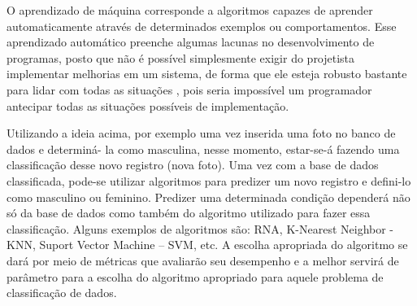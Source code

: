 O aprendizado de máquina corresponde a algoritmos capazes de aprender automaticamente através de determinados exemplos ou comportamentos. Esse aprendizado automático preenche algumas lacunas no desenvolvimento de programas, posto que não é possível simplesmente exigir do projetista implementar melhorias em um sistema, de forma que ele esteja robusto bastante para lidar com todas as situações \cite{RusselStuart.Norvig2013}, pois seria impossível um programador antecipar todas as situações possíveis de implementação.



Utilizando a ideia acima, por exemplo uma vez inserida uma foto no banco de dados e determiná- la como masculina, nesse momento, estar-se-á fazendo uma classificação desse novo registro (nova foto). Uma vez com a base de dados classificada, pode-se utilizar algoritmos para predizer um novo registro e defini-lo como masculino ou feminino. Predizer uma determinada condição dependerá não só da base de dados como também do algoritmo utilizado para fazer essa classificação. Alguns exemplos de algoritmos são: RNA, K-Nearest Neighbor - KNN, Suport Vector Machine – SVM, etc. A escolha apropriada do algoritmo se dará por meio de métricas que avaliarão seu desempenho e a melhor servirá de parâmetro para a escolha do algoritmo apropriado para aquele problema de classificação de dados. 


